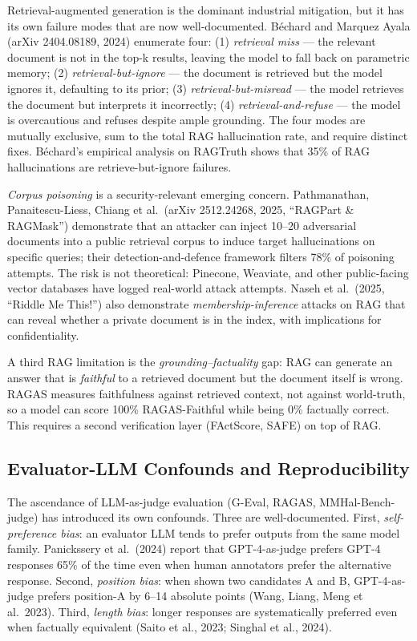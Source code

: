 \documentclass{article}
\begin{document}
Retrieval-augmented generation is the dominant industrial mitigation, but it has its own failure modes that are now well-documented. Béchard and Marquez Ayala (arXiv 2404.08189, 2024) enumerate four: (1) \emph{retrieval miss} --- the relevant document is not in the top-k results, leaving the model to fall back on parametric memory; (2) \emph{retrieval-but-ignore} --- the document is retrieved but the model ignores it, defaulting to its prior; (3) \emph{retrieval-but-misread} --- the model retrieves the document but interprets it incorrectly; (4) \emph{retrieval-and-refuse} --- the model is overcautious and refuses despite ample grounding. The four modes are mutually exclusive, sum to the total RAG hallucination rate, and require distinct fixes. Béchard's empirical analysis on RAGTruth shows that 35\% of RAG hallucinations are retrieve-but-ignore failures.

\emph{Corpus poisoning} is a security-relevant emerging concern. Pathmanathan, Panaitescu-Liess, Chiang et al.~(arXiv 2512.24268, 2025, ``RAGPart \& RAGMask'') demonstrate that an attacker can inject 10--20 adversarial documents into a public retrieval corpus to induce target hallucinations on specific queries; their detection-and-defence framework filters 78\% of poisoning attempts. The risk is not theoretical: Pinecone, Weaviate, and other public-facing vector databases have logged real-world attack attempts. Naseh et al.~(2025, ``Riddle Me This!'') also demonstrate \emph{membership-inference} attacks on RAG that can reveal whether a private document is in the index, with implications for confidentiality.

A third RAG limitation is the \emph{grounding--factuality} gap: RAG can generate an answer that is \emph{faithful} to a retrieved document but the document itself is wrong. RAGAS \citep{es2024ragasautomatedeval} measures faithfulness against retrieved context, not against world-truth, so a model can score 100\% RAGAS-Faithful while being 0\% factually correct. This requires a second verification layer (FActScore, SAFE) on top of RAG.

\subsection{Evaluator-LLM Confounds and Reproducibility}\label{evaluator-llm-confounds-and-reproducibility}

The ascendance of LLM-as-judge evaluation (G-Eval, RAGAS, MMHal-Bench-judge) has introduced its own confounds. Three are well-documented. First, \emph{self-preference bias}: an evaluator LLM tends to prefer outputs from the same model family. Panickssery et al.~(2024) report that GPT-4-as-judge prefers GPT-4 responses 65\% of the time even when human annotators prefer the alternative response. Second, \emph{position bias}: when shown two candidates A and B, GPT-4-as-judge prefers position-A by 6--14 absolute points (Wang, Liang, Meng et al.~2023). Third, \emph{length bias}: longer responses are systematically preferred even when factually equivalent (Saito et al., 2023; Singhal et al., 2024).
\end{document}
